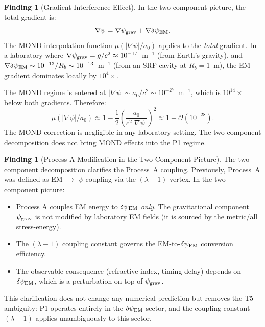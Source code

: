 \documentclass[11pt]{article}
\newcommand{\lam}{\lambda}
\newcommand{\order}[1]{\mathcal{O}(#1)}
\newcommand{\psigrav}{\psi_{\rm grav}}
\newcommand{\dpsiEM}{\delta\psi_{\rm EM}}
\theoremstyle{definition}
\newtheorem{finding}[theorem]{Finding}
\theoremstyle{remark}
\begin{document}
\begin{finding}[Gradient Interference Effect]
\label{find:gradient_interference}
In the two-component picture, the total gradient is:
\begin{equation}
\nabla\psi = \nabla\psigrav + \nabla\dpsiEM.
\label{eq:grad_total}
\end{equation}
The MOND interpolation function $\mu(|\nabla\psi|/a_0)$ applies to the
\emph{total} gradient. In a laboratory where $\nabla\psigrav = g/c^2
\approx 10^{-17}$~m$^{-1}$ (from Earth's gravity), and
$\nabla\dpsiEM \sim 10^{-13}/R_b \sim 10^{-13}$~m$^{-1}$ (from an
SRF cavity at $R_b = 1$~m), the EM gradient dominates locally by
$10^{4}\times$.

The MOND regime is entered at $|\nabla\psi| \sim a_0/c^2 \sim 10^{-27}$~m$^{-1}$,
which is $10^{14}\times$ below both gradients. Therefore:
\begin{equation}
\mu(|\nabla\psi|/a_0) \approx 1 - \frac{1}{2}\left(\frac{a_0}{c^2|\nabla\psi|}\right)^2
\approx 1 - \order{10^{-28}}.
\end{equation}
The MOND correction is negligible in any laboratory setting. The two-component
decomposition does not bring MOND effects into the P1 regime.
\end{finding}

\begin{finding}[Process A Modification in the Two-Component Picture]
\label{find:process_A_mod}
The two-component decomposition clarifies the Process~A coupling.
Previously, Process~A was defined as EM $\to$ $\psi$ coupling via the
$(\lam-1)$ vertex. In the two-component picture:
\begin{itemize}[nosep]
\item Process A couples EM energy to $\dpsiEM$ \emph{only}. The
  gravitational component $\psigrav$ is not modified by laboratory
  EM fields (it is sourced by the metric/all stress-energy).
\item The $(\lam-1)$ coupling constant governs the EM-to-$\dpsiEM$
  conversion efficiency.
\item The observable consequence (refractive index, timing delay) depends
  on $\dpsiEM$, which is a perturbation on top of $\psigrav$.
\end{itemize}

This clarification does not change any numerical prediction but removes
the T5 ambiguity: P1 operates entirely in the $\dpsiEM$ sector, and
the coupling constant $(\lam-1)$ applies unambiguously to this sector.
\end{finding}
\end{document}
